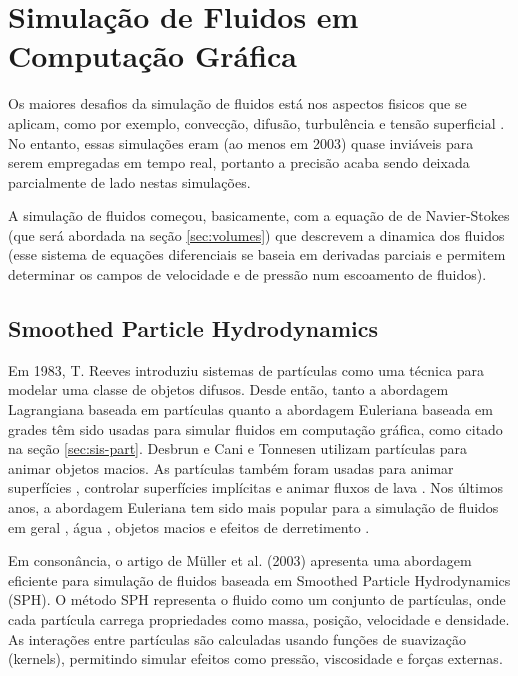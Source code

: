 \section{Simulação de Fluidos em Computação Gráfica}

Os maiores desafios da simulação de fluidos está nos aspectos fisicos que se aplicam, como por exemplo, convecção, difusão, turbulência e tensão superficial \cite{desbrun1996}. No entanto, essas simulações eram (ao menos em 2003) quase inviáveis para serem empregadas em tempo real, portanto a precisão acaba sendo deixada parcialmente de lado nestas simulações.

A simulação de fluidos começou, basicamente, com a equação de de Navier-Stokes (que será abordada na seção \ref{sec:volumes}) que descrevem a dinamica dos fluidos (esse sistema de equações diferenciais se baseia em derivadas parciais e permitem determinar os campos de velocidade e de pressão num escoamento de fluidos). 

\subsection{Smoothed Particle Hydrodynamics}

Em 1983, T. Reeves \cite{reeves1983} introduziu sistemas de partículas como uma técnica para modelar uma classe de objetos difusos. Desde então, tanto a abordagem Lagrangiana baseada em partículas quanto a abordagem Euleriana baseada em grades têm sido usadas para simular fluidos em computação gráfica, como citado na seção \ref{sec:sis-part}. Desbrun e Cani \cite{desbrun1996} e Tonnesen \cite{tonnesen1998} utilizam partículas para animar objetos macios. As partículas também foram usadas para animar superfícies \cite{witkin1991}, controlar superfícies implícitas \cite{bloomenthal1997} e animar fluxos de lava \cite{carlson2002}. Nos últimos anos, a abordagem Euleriana tem sido mais popular para a simulação de fluidos em geral \cite{fedkiw2001}, água \cite{stam1999, foster1996, enright2002}, objetos macios \cite{muller2002} e efeitos de derretimento \cite{carlson2002}.

Em consonância, o artigo de Müller et al. (2003) \cite{muller2003} apresenta uma abordagem eficiente para simulação de fluidos baseada em Smoothed Particle Hydrodynamics (SPH). O método SPH representa o fluido como um conjunto de partículas, onde cada partícula carrega propriedades como massa, posição, velocidade e densidade. As interações entre partículas são calculadas usando funções de suavização (kernels), permitindo simular efeitos como pressão, viscosidade e forças externas.

